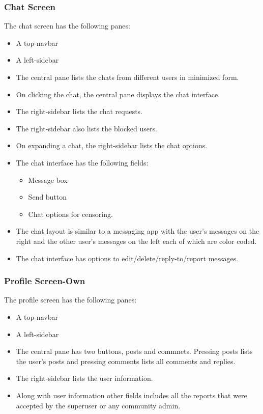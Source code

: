 \documentclass[conference,compsoc]{IEEEtran}
\begin{document}
\subsubsection{Chat Screen}
\vspace{0.2cm}
The chat screen has the following panes:
\begin{itemize}
    \item A top-navbar
    \item A left-sidebar
    \item The central pane lists the chats from different users in minimized form.
    \item On clicking the chat, the central pane displays the chat interface.
    \item The right-sidebar lists the chat requests.
    \item The right-sidebar also lists the blocked users.
    \item On expanding a chat, the right-sidebar lists the chat options.
    \item The chat interface has the following fields:
          \begin{itemize}
              \item Message box
              \item Send button
              \item Chat options for censoring.
          \end{itemize}
    \item The chat layout is similar to a messaging app with the user's messages on the right and the other user's messages on the left each of which are color coded.
    \item The chat interface has options to edit/delete/reply-to/report messages.
\end{itemize}

\subsubsection{Profile Screen-Own}
\vspace{0.2cm}
The profile screen has the following panes:
\begin{itemize}
    \item A top-navbar
    \item A left-sidebar
    \item The central pane has two buttons, posts and commnets. Pressing posts lists the user's posts and pressing comments lists all comments and replies.
    \item The right-sidebar lists the user information.
    \item Along with user information other fields includes all the reports that were accepted by the superuser or any community admin.
\end{itemize}
\end{document}

